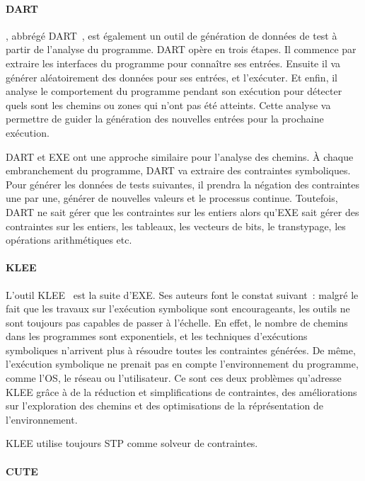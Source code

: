\paragraph{DART} , abbrégé
DART~, est également un outil de génération de données de
test à partir de l'analyse du programme. DART opère en trois étapes. Il
commence par extraire les interfaces du programme pour connaître ses
entrées. Ensuite il va générer aléatoirement des données pour ses entrées, et
l'exécuter. Et enfin, il analyse le comportement du programme pendant son
exécution pour détecter quels sont les chemins ou zones qui n'ont pas été
atteints. Cette analyse va permettre de guider la génération des nouvelles
entrées pour la prochaine exécution.

DART et EXE ont une approche similaire pour l'analyse des chemins. À chaque
embranchement du programme, DART va extraire des contraintes symboliques. Pour
générer les données de tests suivantes, il prendra la négation des contraintes
une par une, générer de nouvelles valeurs et le processus continue. Toutefois,
DART ne sait gérer que les contraintes sur les entiers alors qu'EXE sait gérer
des contraintes sur les entiers, les tableaux, les vecteurs de bits, le
transtypage, les opérations arithmétiques etc.

\paragraph{KLEE} L'outil KLEE~ est la suite d'EXE. Ses auteurs
font le constat suivant~: malgré le fait que les travaux sur l'exécution
symbolique sont encourageants, les outils ne sont toujours pas capables de
passer à l'échelle. En effet, le nombre de chemins dans les programmes sont
exponentiels, et les techniques d'exécutions symboliques n'arrivent plus à
résoudre toutes les contraintes générées. De même, l'exécution symbolique ne
prenait pas en compte l'environnement du programme, comme l'OS, le réseau ou
l'utilisateur. Ce sont ces deux problèmes qu'adresse KLEE grâce à de la
réduction et simplifications de contraintes, des améliorations sur l'exploration
des chemins et des optimisations de la réprésentation de l'environnement.

KLEE utilise toujours STP comme solveur de contraintes.

\paragraph{CUTE} 

